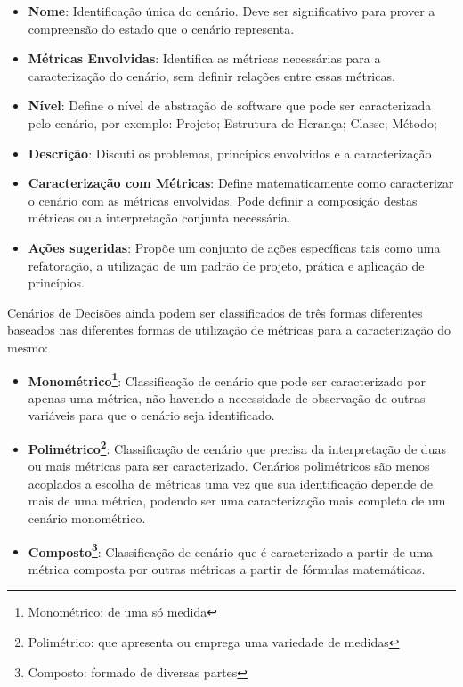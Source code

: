 \begin{itemize}
\item \textbf{Nome}: Identificação única do cenário. Deve ser significativo para prover a compreensão do estado que o cenário representa.

\item \textbf{Métricas Envolvidas}: Identifica as métricas necessárias para a caracterização do cenário, sem definir relações entre essas métricas.

\item \textbf{Nível}: Define o nível de abstração de software que pode ser caracterizada pelo cenário, por exemplo: Projeto; Estrutura de Herança; Classe; Método;

\item \textbf{Descrição}: Discuti os problemas, princípios envolvidos e a caracterização

\item \textbf{Caracterização com Métricas}: Define matematicamente como caracterizar o cenário com as métricas envolvidas. Pode definir a composição destas métricas ou a interpretação conjunta necessária.

\item \textbf{Ações sugeridas}: Propõe um conjunto de ações específicas tais como uma refatoração, a utilização de um padrão de projeto, prática e aplicação de princípios.
\end{itemize}

Cenários de Decisões ainda podem ser classificados de três formas diferentes baseados nas diferentes formas de utilização de métricas para a caracterização do mesmo:

\begin{itemize}
\item \textbf{Monométrico\footnote{Monométrico: de uma só medida}}: Classificação de cenário que pode ser caracterizado por apenas uma métrica, não havendo a necessidade de observação de outras variáveis para que o cenário seja identificado.

\item \textbf{Polimétrico\footnote{Polimétrico: que apresenta ou emprega uma variedade de medidas}}: Classificação de cenário que precisa da interpretação de duas ou mais métricas para ser caracterizado. Cenários polimétricos são menos acoplados a escolha de métricas uma vez que sua identificação depende de mais de uma métrica, podendo ser uma caracterização mais completa de um cenário monométrico. 

\item \textbf{Composto\footnote{Composto: formado de diversas partes}}: Classificação de cenário que é caracterizado a partir de uma métrica composta por outras métricas a partir de fórmulas matemáticas.
\end{itemize}

